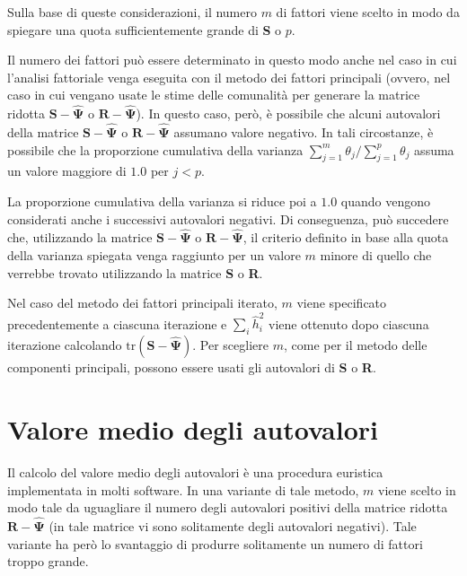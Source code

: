 Sulla base di queste considerazioni, il numero $m$ di
fattori viene scelto in modo da spiegare una quota sufficientemente grande
di \textbf{S} o $p$.

Il numero dei fattori può essere determinato in questo modo anche nel
caso in cui l'analisi fattoriale venga eseguita con il metodo dei
fattori principali (ovvero, nel caso in cui vengano usate le stime
delle comunalità per generare la matrice ridotta $\textbf{S} -
\hat{\boldsymbol{\Psi}}$ o $\textbf{R} - \hat{\boldsymbol{\Psi}}$).
 In
questo caso, però, è possibile che alcuni autovalori della matrice
$\textbf{S} - \hat{\boldsymbol{\Psi}}$ o $\textbf{R} -
\hat{\boldsymbol{\Psi}}$ assumano valore negativo. 
 In tali
circostanze, è possibile che la proporzione cumulativa della varianza
$\sum_{j=1}^m \theta_j / \sum_{j=1}^p \theta_j$ assuma un valore
maggiore di $1.0$ per $j < p$. 

La proporzione cumulativa della
varianza si riduce poi a $1.0$ quando vengono considerati
anche i successivi autovalori negativi. 
 Di conseguenza, può succedere
che, utilizzando la matrice $\textbf{S} - \hat{\boldsymbol{\Psi}}$ o
$\textbf{R} - \hat{\boldsymbol{\Psi}}$, il criterio definito in base
alla quota della varianza spiegata venga raggiunto per un valore $m$
minore di quello che verrebbe trovato utilizzando la matrice
\textbf{S} o \textbf{R}.

 Nel caso del metodo dei fattori principali iterato, $m$ viene
specificato precedentemente a ciascuna iterazione e $\sum_{i}
\hat{h}^2_i$ viene ottenuto dopo ciascuna iterazione calcolando
$\text{tr}(\textbf{S} - \hat{\boldsymbol{\Psi}})$. Per scegliere $m$,
come per il metodo delle componenti principali, possono essere
usati gli autovalori di \textbf{S} o \textbf{R}.



\section{Valore medio degli autovalori}

Il calcolo del valore medio degli autovalori è una procedura euristica  implementata in molti software. In una
variante di tale metodo, $m$ viene scelto in modo tale da uguagliare
il numero degli autovalori positivi della matrice ridotta  $\textbf{R}
- \hat{\boldsymbol{\Psi}}$ (in tale matrice vi sono solitamente degli autovalori negativi). Tale
variante ha però lo svantaggio di produrre solitamente un numero di
fattori troppo grande.
  


